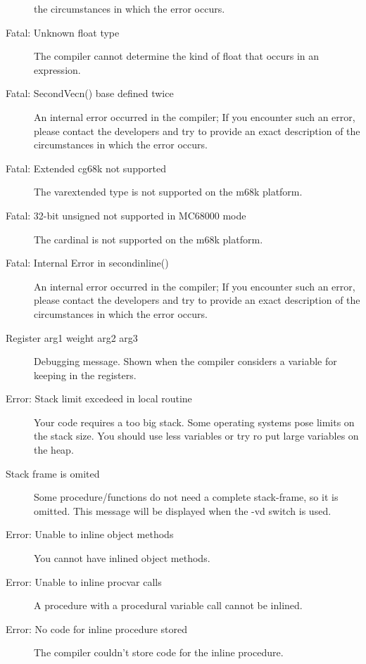 \begin{description}
 the circumstances in which the error occurs.
\item [Fatal: Unknown float type]
 The compiler cannot determine the kind of float that occurs in an expression.
\item [Fatal: SecondVecn() base defined twice]
 An internal error occurred in the compiler; If you encounter such an error,
 please contact the developers and try to provide  an exact description of
 the circumstances in which the error occurs.
\item [Fatal: Extended cg68k not supported]
 The var{extended} type is not supported on the m68k platform.
\item [Fatal: 32-bit unsigned not supported in MC68000 mode]
 The cardinal is not supported on the m68k platform.
\item [Fatal: Internal Error in secondinline()]
 An internal error occurred in the compiler; If you encounter such an error,
 please contact the developers and try to provide  an exact description of
 the circumstances in which the error occurs.
\item [Register arg1 weight arg2 arg3]
 Debugging message. Shown when the compiler considers a variable for
 keeping in the registers.
\item [Error: Stack limit excedeed in local routine]
 Your code requires a too big stack. Some operating systems pose limits 
 on the stack size. You should use less variables or try ro put large
 variables on the heap. 
\item [Stack frame is omited]
 Some procedure/functions do not need a complete stack-frame, so it is omitted.
 This message will be displayed when the {-vd} switch is used.
\item [Error: Unable to inline object methods]
 You cannot have inlined object methods.
\item [Error: Unable to inline procvar calls]
 A procedure with a procedural variable call cannot be inlined.
\item [Error: No code for inline procedure stored]
 The compiler couldn't store code for the inline procedure.
 \end{description}
